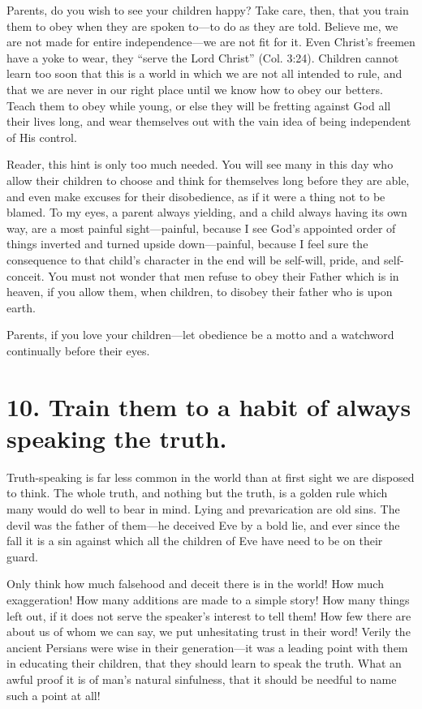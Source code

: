 \documentclass[
]{book}
\begin{document}
Parents, do you wish to see your children happy? Take care, then, that you train them to obey when they are spoken to---to do as they are told. Believe me, we are not made for entire independence---we are not fit for it. Even Christ's freemen have a yoke to wear, they ``serve the Lord Christ'' (Col. 3:24). Children cannot learn too soon that this is a world in which we are not all intended to rule, and that we are never in our right place until we know how to obey our betters. Teach them to obey while young, or else they will be fretting against God all their lives long, and wear themselves out with the vain idea of being independent of His control.

Reader, this hint is only too much needed. You will see many in this day who allow their children to choose and think for themselves long before they are able, and even make excuses for their disobedience, as if it were a thing not to be blamed. To my eyes, a parent always yielding, and a child always having its own way, are a most painful sight---painful, because I see God's appointed order of things inverted and turned upside down---painful, because I feel sure the consequence to that child's character in the end will be self-will, pride, and self-conceit. You must not wonder that men refuse to obey their Father which is in heaven, if you allow them, when children, to disobey their father who is upon earth.

Parents, if you love your children---let obedience be a motto and a watchword continually before their eyes.

\hypertarget{train-them-to-a-habit-of-always-speaking-the-truth.}{%
\section*{10. Train them to a habit of always speaking the truth.}\label{train-them-to-a-habit-of-always-speaking-the-truth.}}

Truth-speaking is far less common in the world than at first sight we are disposed to think. The whole truth, and nothing but the truth, is a golden rule which many would do well to bear in mind. Lying and prevarication are old sins. The devil was the father of them---he deceived Eve by a bold lie, and ever since the fall it is a sin against which all the children of Eve have need to be on their guard.

Only think how much falsehood and deceit there is in the world! How much exaggeration! How many additions are made to a simple story! How many things left out, if it does not serve the speaker's interest to tell them! How few there are about us of whom we can say, we put unhesitating trust in their word! Verily the ancient Persians were wise in their generation---it was a leading point with them in educating their children, that they should learn to speak the truth. What an awful proof it is of man's natural sinfulness, that it should be needful to name such a point at all!
\end{document}
